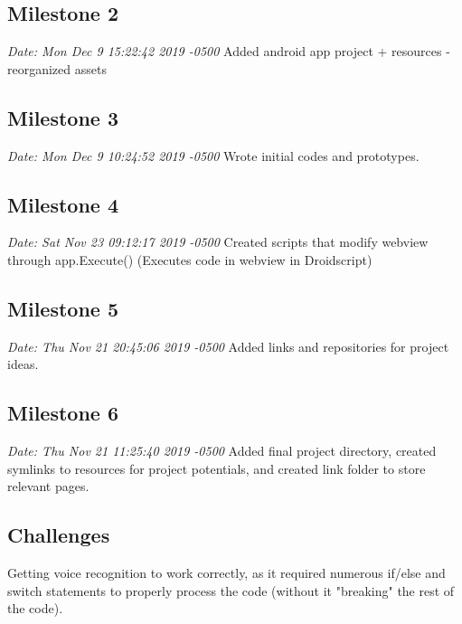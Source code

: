 \documentclass[sigconf]{acmart}
\begin{document}
    \subsection{Milestone 2}
    \textit{Date:   Mon Dec 9 15:22:42 2019 -0500}\newline
    Added android app project + resources - reorganized assets
    
    \subsection{Milestone 3}
    
    \textit{Date:   Mon Dec 9 10:24:52 2019 -0500}\newline
    Wrote initial codes and prototypes.
    
    \subsection{Milestone 4}
    
    \textit{Date:   Sat Nov 23 09:12:17 2019 -0500}\newline
    Created scripts that modify webview through app.Execute() (Executes code in webview in Droidscript)
    
    \subsection{Milestone 5}
    
    \textit{Date:   Thu Nov 21 20:45:06 2019 -0500}\newline
    Added links and repositories for project ideas.
    
    \subsection{Milestone 6}
    \textit{Date:   Thu Nov 21 11:25:40 2019 -0500}\newline
    Added final project directory, created symlinks to resources for project potentials, and created link folder to store relevant pages.
    
    \subsection{Challenges}
    Getting voice recognition to work correctly, as it required numerous if/else and switch statements to properly process the code (without it "breaking" the rest of the code).
    
\end{document}
